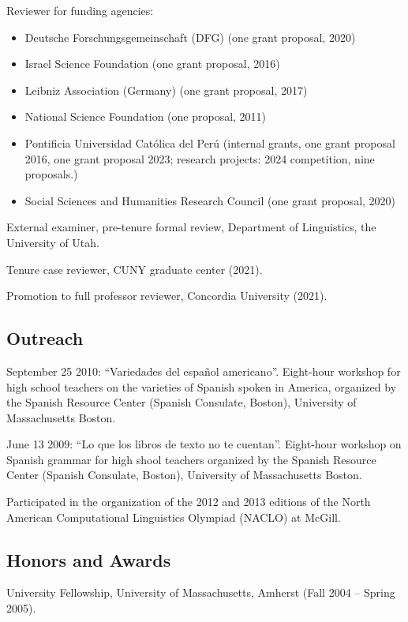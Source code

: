 \documentclass[11pt]{article}
\begin{document}
Reviewer for funding agencies:

\begin{itemize}
  \item[] Deutsche Forschungsgemeinschaft (DFG) (one grant proposal, 2020)
  \item[] Israel Science Foundation (one grant proposal, 2016)
  \item[] Leibniz Association (Germany) (one grant proposal, 2017)
  \item[] National Science Foundation (one proposal, 2011)
  \item[] Pontificia Universidad Cat\'olica del Per\'u (internal grants, one grant proposal 2016, one grant proposal 2023; research projects: 2024 competition, nine proposals.)
  \item[] Social Sciences and Humanities Research Council (one grant proposal, 2020)
  \end{itemize}


External examiner, pre-tenure formal review, Department of Linguistics, the University of Utah.

Tenure case reviewer, CUNY graduate center (2021).

Promotion to full professor reviewer, Concordia University (2021).


\subsection*{Outreach}


September 25 2010: ``Variedades del espa\~nol americano''. Eight-hour
workshop for high school teachers on the varieties of Spanish spoken in America, organized by the
Spanish Resource Center (Spanish Consulate, Boston), University of Massachusetts Boston.

June 13 2009: ``Lo que los libros de texto no te cuentan''. Eight-hour
workshop  on Spanish grammar for high shool teachers organized by the
Spanish Resource Center (Spanish Consulate, Boston), University of
Massachusetts Boston.

Participated in the organization of the 2012 and 2013 editions of the North
American Computational Linguistics Olympiad (NACLO) at McGill.


\subsection*{Honors and Awards} 

University Fellowship, University of Massachusetts, Amherst (Fall
 2004 -- Spring 2005).
\end{document}
